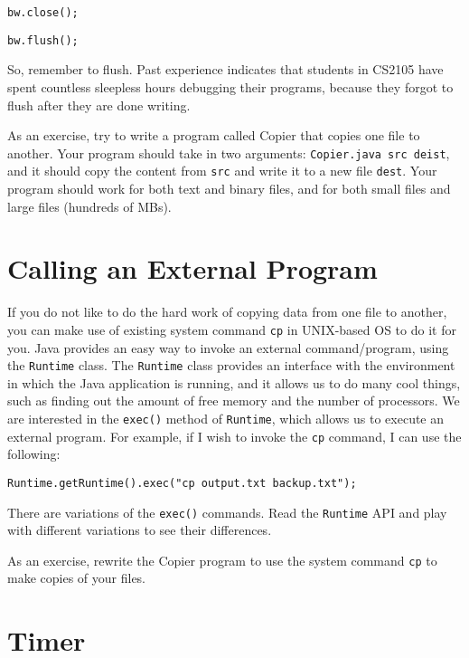 \documentclass[a4paper,11pt]{exam}
\begin{document}
\begin{verbatim}
bw.close();
\end{verbatim}

\begin{verbatim}
bw.flush();
\end{verbatim}

So, remember to flush.  Past experience indicates that students in CS2105 have spent countless sleepless hours debugging their programs, because they forgot to flush after they are done writing.

As an exercise, try to write a program called Copier that copies one file to another.  Your program should take in two arguments: \texttt{Copier.java src deist}, and it should copy the content from \texttt{src} and write it to a new file \texttt{dest}.  Your program should work for both text and binary files, and for both small files and large files (hundreds of MBs).

\section*{Calling an External Program}

If you do not like to do the hard work of copying data from one file to another, you can make use of existing system command \texttt{cp} in UNIX-based OS to do it for you.  Java provides an easy way to invoke an external command/program, using the \texttt{Runtime} class.  The \texttt{Runtime} class provides an interface with the environment in which the Java application is running, and it allows us to do many cool things, such as finding out the amount of free memory and the number of processors.  We are interested in the \texttt{exec()} method of \texttt{Runtime}, which allows us to execute an external program.  For example, if I wish to invoke the \texttt{cp} command, I can use the following:

\begin{verbatim}
Runtime.getRuntime().exec("cp output.txt backup.txt");
\end{verbatim}

There are variations of the \texttt{exec()} commands.  Read the \texttt{Runtime} API and play with different variations to see their differences.

As an exercise, rewrite the Copier program to use the system command \texttt{cp} to make copies of your files.

\section*{Timer}
\end{document}
